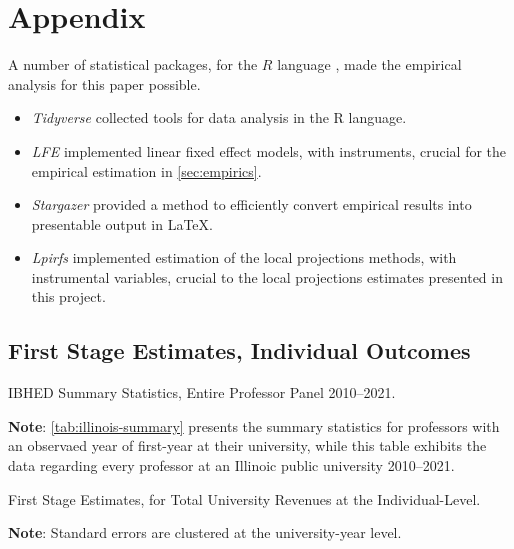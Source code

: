 \documentclass[notitlepage,12pt]{article}
\begin{document}
\section{Appendix}
\label{appendix}
A number of statistical packages, for the $R$ language \citep{R2022}, made the empirical analysis for this paper possible.
\begin{itemize}
    \item \textit{Tidyverse} \citep{tidyverse} collected tools for data analysis in the R language.
    \item \textit{LFE} \citep{lfe} implemented linear fixed effect models, with instruments, crucial for the empirical estimation in \autoref{sec:empirics}.
    \item \textit{Stargazer} \citep{stargazer} provided a method to efficiently convert empirical results into presentable output in \LaTeX.
    \item \textit{Lpirfs} \citep{lpirfs2019} implemented estimation of the \cite{jorda2005} local projections methods, with instrumental variables, crucial to the local projections estimates presented in this project.
\end{itemize}


\subsection{First Stage Estimates, Individual Outcomes}
\label{appendix:part1}

\begin{table}[h!]
    \onehalfspacing
    \centering
    \caption{IBHED Summary Statistics, Entire Professor Panel 2010--2021.}
    \makebox[\textwidth][c]{}
    \label{tab:illinois-summary-entire}
    \begin{flushleft}
        \footnotesize
        \textbf{Note}: \autoref{tab:illinois-summary} presents the summary statistics for professors with an observaed year of first-year at their university, while this table exhibits the data regarding every professor at an Illinoic public university 2010--2021.
    \end{flushleft}
\end{table}

\begin{table}[H]
    \onehalfspacing
    \centering
    \caption{First Stage Estimates, for Total University Revenues at the Individual-Level.}
    \makebox[\textwidth][c]{}
    \label{tab:firststage-illinois}
    \begin{flushleft}
        \footnotesize
        \textbf{Note}: Standard errors are clustered at the university-year level.
    \end{flushleft}
\end{table}
\end{document}
